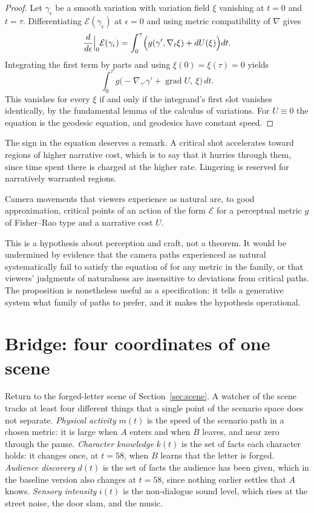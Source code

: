 \begin{proof}
Let $\gamma_\epsilon$ be a smooth variation with variation field $\xi$ vanishing at $t=0$ and $t=\tau$. Differentiating $\mathcal{E}(\gamma_\epsilon)$ at $\epsilon=0$ and using metric compatibility of $\nabla$ gives
\[
\frac{d}{d\epsilon}\Big|_0\mathcal{E}(\gamma_\epsilon)=\int_0^\tau\Bigl(g(\gamma',\nabla_t\xi)+dU(\xi)\Bigr)dt.
\]
Integrating the first term by parts and using $\xi(0)=\xi(\tau)=0$ yields
\[
\int_0^\tau g\bigl(-\nabla_{\gamma'}\gamma'+\operatorname{grad}U,\ \xi\bigr)\,dt.
\]
This vanishes for every $\xi$ if and only if the integrand's first slot vanishes identically, by the fundamental lemma of the calculus of variations. For $U\equiv0$ the equation is the geodesic equation, and geodesics have constant speed.
\end{proof}

The sign in the equation deserves a remark. A critical shot accelerates toward regions of higher narrative cost, which is to say that it hurries through them, since time spent there is charged at the higher rate. Lingering is reserved for narratively warranted regions.

\begin{principle}\label{pr:geodesic}
Camera movements that viewers experience as natural are, to good approximation, critical points of an action of the form $\mathcal{E}$ for a perceptual metric $g$ of Fisher--Rao type and a narrative cost $U$.
\end{principle}

This is a hypothesis about perception and craft, not a theorem. It would be undermined by evidence that the camera paths experienced as natural systematically fail to satisfy the equation of  for any metric in the family, or that viewers' judgments of naturalness are insensitive to deviations from critical paths. The proposition is nonetheless useful as a specification: it tells a generative system what family of paths to prefer, and it makes the hypothesis operational.

\section{Bridge: four coordinates of one scene}

Return to the forged-letter scene of Section~\ref{sec:scene}. A watcher of the scene tracks at least four different things that a single point of the scenario space does not separate. \emph{Physical activity} $m(t)$ is the speed of the scenario path in a chosen metric: it is large when $A$ enters and when $B$ leaves, and near zero through the pause. \emph{Character knowledge} $k(t)$ is the set of facts each character holds: it changes once, at $t=58$, when $B$ learns that the letter is forged. \emph{Audience discovery} $d(t)$ is the set of facts the audience has been given, which in the baseline version also changes at $t=58$, since nothing earlier settles that $A$ knows. \emph{Sensory intensity} $i(t)$ is the non-dialogue sound level, which rises at the street noise, the door slam, and the music.

